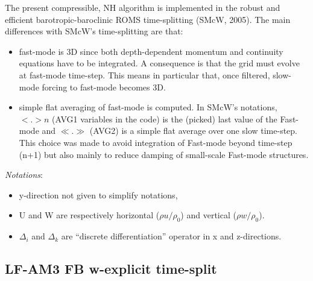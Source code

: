 \documentclass[a4paper]{article}
\numberwithin{equation}{section}
\begin{document}
  The present compressible, NH algorithm is implemented in the robust and efficient barotropic-baroclinic ROMS time-splitting (SMcW, 2005). The main differences with SMcW's time-splitting are that:
  \begin{itemize}
   \item fast-mode is 3D since both depth-dependent momentum and continuity equations have to be integrated. A consequence is that the grid must evolve at fast-mode time-step. This means in particular that, once filtered, slow-mode forcing to fast-mode becomes 3D.
   \item simple flat averaging of fast-mode is computed. In SMcW's notations, $<.>n$ (AVG1 variables in the code) is the (picked) last value of the Fast-mode and $\ll.\gg$ (AVG2) is a simple flat average over one slow time-step. This choice was made to avoid integration of Fast-mode beyond time-step (n+1) but also mainly to reduce damping of small-scale Fast-mode structures.\\
  \end{itemize}

   \textit{Notations}: 
  \begin{itemize}[label=\textbullet,font=\tiny]
   \item y-direction not given to simplify notations,
   \item U and W are respectively horizontal ($\rho u /\rho_0$) and vertical ($\rho w / \rho_0$).
   \item $\Delta_i$ and $\Delta_k$ are ``discrete differentiation'' operator in x and z-directions. 
  \end{itemize}
 \subsection{LF-AM3 FB w-explicit time-split}
 \label{Subsec-FB}
 
\end{document}
